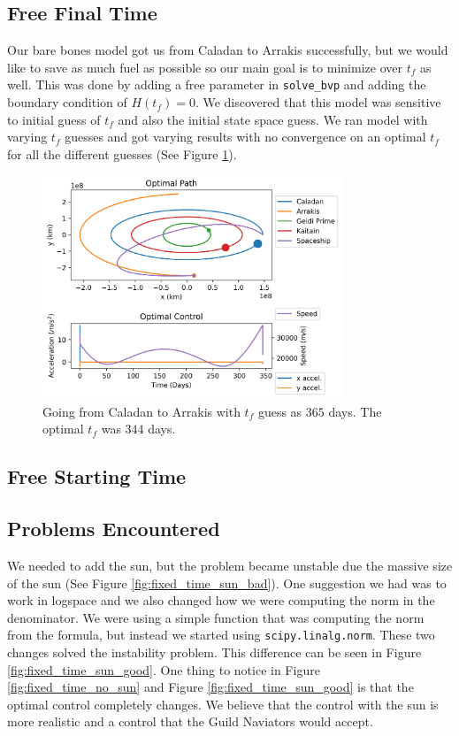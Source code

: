 \documentclass[11pt]{amsart}
\begin{document}
\subsection{Free Final Time}

Our bare bones model got us from Caladan to Arrakis successfully, but we would like to save as much fuel as possible so our main goal is to minimize over $t_f$ as well. This was done by 
adding a free parameter in \lstinline{solve_bvp} and adding the boundary condition of $H(t_f) = 0$. We discovered that this model was sensitive to initial guess of $t_f$ and also the initial
state space guess. We ran model with varying $t_f$ guesses and got varying results with no convergence on an optimal $t_f$ for all the different guesses (See Figure \ref{fig:free_time_no_sun}). 

\begin{figure}[htp]
    \centering
    \includegraphics[width=0.8\textwidth]{f5.png}\hfill
    \caption{Going from Caladan to Arrakis with $t_f$ guess as $365$ days. The optimal $t_f$ was $344$ days.}
    \label{fig:free_time_no_sun}
\end{figure}

\subsection{Free Starting Time}

\subsection{Problems Encountered}

We needed to add the sun, but the problem became unstable due the massive size of the sun (See Figure \ref{fig:fixed_time_sun_bad}). One suggestion we had was to work in logspace and we also changed how 
we were computing the norm in the denominator. We were using a simple function that was computing the norm from the formula, but instead we started using \lstinline{scipy.linalg.norm}. These two changes 
solved the instability problem. This difference can be seen in Figure \ref{fig:fixed_time_sun_good}. One thing to notice in Figure \ref{fig:fixed_time_no_sun} and Figure \ref{fig:fixed_time_sun_good} is that the
optimal control completely changes. We believe that the control with the sun is more realistic and a control that the Guild Naviators would accept.
\end{document}
